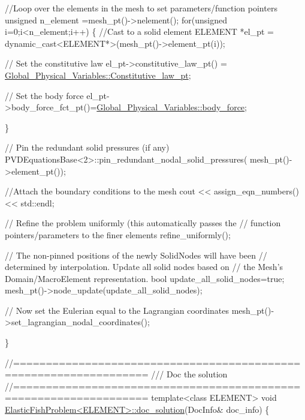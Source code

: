 \begin{DoxyCodeInclude}
 \textcolor{comment}{//Loop over the elements in the mesh to set parameters/function pointers}
 \textcolor{keywordtype}{unsigned}  n\_element =mesh\_pt()->nelement();
 \textcolor{keywordflow}{for}(\textcolor{keywordtype}{unsigned} i=0;i<n\_element;i++)
  \{
   \textcolor{comment}{//Cast to a solid element}
   ELEMENT *el\_pt = \textcolor{keyword}{dynamic\_cast<}ELEMENT*\textcolor{keyword}{>}(mesh\_pt()->element\_pt(i));
   
   \textcolor{comment}{// Set the constitutive law}
   el\_pt->constitutive\_law\_pt() =
    \hyperlink{namespaceGlobal__Physical__Variables_a2a37fb040c832ee7a086bb13bb02a100}{Global\_Physical\_Variables::Constitutive\_law\_pt};
   
   \textcolor{comment}{// Set the body force}
   el\_pt->body\_force\_fct\_pt()=\hyperlink{namespaceGlobal__Physical__Variables_a313e702a9e8fdec808702c9bbf38b192}{Global\_Physical\_Variables::body\_force};
   
  \}

 \textcolor{comment}{// Pin the redundant solid pressures (if any)}
 PVDEquationsBase<2>::pin\_redundant\_nodal\_solid\_pressures(
  mesh\_pt()->element\_pt());

 \textcolor{comment}{//Attach the boundary conditions to the mesh}
 cout << assign\_eqn\_numbers() << std::endl; 

 \textcolor{comment}{// Refine the problem uniformly (this automatically passes the}
 \textcolor{comment}{// function pointers/parameters to the finer elements}
 refine\_uniformly();

 \textcolor{comment}{// The non-pinned positions of the newly SolidNodes will have been}
 \textcolor{comment}{// determined by interpolation. Update all solid nodes based on }
 \textcolor{comment}{// the Mesh's Domain/MacroElement representation.}
 \textcolor{keywordtype}{bool} update\_all\_solid\_nodes=\textcolor{keyword}{true};
 mesh\_pt()->node\_update(update\_all\_solid\_nodes);

 \textcolor{comment}{// Now set the Eulerian equal to the Lagrangian coordinates}
 mesh\_pt()->set\_lagrangian\_nodal\_coordinates();
 
\} 


\textcolor{comment}{//==================================================================}\textcolor{comment}{}
\textcolor{comment}{/// Doc the solution}
\textcolor{comment}{}\textcolor{comment}{//==================================================================}
\textcolor{keyword}{template}<\textcolor{keyword}{class} ELEMENT>
\textcolor{keywordtype}{void} \hyperlink{classElasticFishProblem_a5cd7dbd2bc99ccf850c1a58d0b401979}{ElasticFishProblem<ELEMENT>::doc\_solution}(DocInfo& doc\_info)
\{


\end{DoxyCodeInclude}
